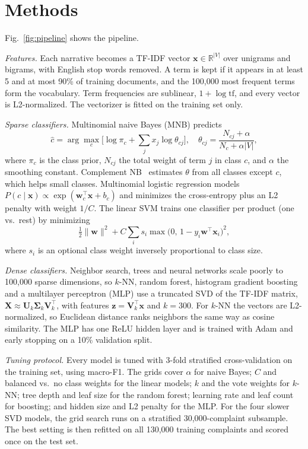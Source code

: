 \documentclass[conference]{IEEEtran}
\begin{document}
\section{Methods}
Fig.~\ref{fig:pipeline} shows the pipeline.

\textit{Features.} Each narrative becomes a TF-IDF vector $\mathbf{x}\in\mathbb{R}^{|V|}$ over unigrams and bigrams, with English stop words removed. A term is kept if it appears in at least 5 and at most 90\% of training documents, and the 100,000 most frequent terms form the vocabulary. Term frequencies are sublinear, $1+\log \mathrm{tf}$, and every vector is L2-normalized. The vectorizer is fitted on the training set only.

\textit{Sparse classifiers.} Multinomial naive Bayes (MNB) predicts
\begin{equation}
\hat{c} = \arg\max_{c}\Big[\log \pi_c + \sum_{j} x_j \log \theta_{cj}\Big],\quad
\theta_{cj} = \frac{N_{cj}+\alpha}{N_c+\alpha|V|},
\end{equation}
where $\pi_c$ is the class prior, $N_{cj}$ the total weight of term $j$ in class $c$, and $\alpha$ the smoothing constant. Complement NB~\cite{rennie} estimates $\theta$ from all classes except $c$, which helps small classes. Multinomial logistic regression models $P(c\mid\mathbf{x}) \propto \exp(\mathbf{w}_c^\top\mathbf{x}+b_c)$ and minimizes the cross-entropy plus an L2 penalty with weight $1/C$. The linear SVM trains one classifier per product (one vs.\ rest) by minimizing
\begin{equation}
\tfrac{1}{2}\lVert\mathbf{w}\rVert^2 + C\sum_i s_i \max\!\big(0,\,1-y_i\mathbf{w}^\top\mathbf{x}_i\big)^2,
\end{equation}
where $s_i$ is an optional class weight inversely proportional to class size.

\textit{Dense classifiers.} Neighbor search, trees and neural networks scale poorly to 100,000 sparse dimensions, so $k$-NN, random forest, histogram gradient boosting and a multilayer perceptron (MLP) use a truncated SVD of the TF-IDF matrix, $\mathbf{X}\approx\mathbf{U}_k\boldsymbol{\Sigma}_k\mathbf{V}_k^\top$, with features $\mathbf{z}=\mathbf{V}_k^\top\mathbf{x}$ and $k=300$. For $k$-NN the vectors are L2-normalized, so Euclidean distance ranks neighbors the same way as cosine similarity. The MLP has one ReLU hidden layer and is trained with Adam and early stopping on a 10\% validation split.

\textit{Tuning protocol.} Every model is tuned with 3-fold stratified cross-validation on the training set, using macro-F1. The grids cover $\alpha$ for naive Bayes; $C$ and balanced vs.\ no class weights for the linear models; $k$ and the vote weights for $k$-NN; tree depth and leaf size for the random forest; learning rate and leaf count for boosting; and hidden size and L2 penalty for the MLP. For the four slower SVD models, the grid search runs on a stratified 30,000-complaint subsample. The best setting is then refitted on all 130,000 training complaints and scored once on the test set.
\end{document}
